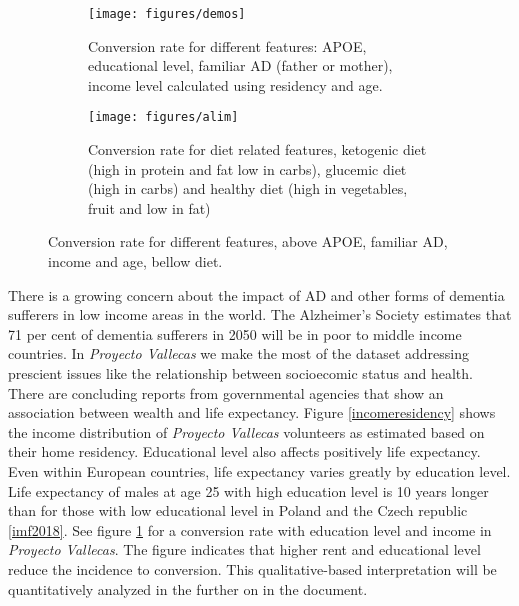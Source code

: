 \documentclass[11pt]{article}
\begin{document}
\begin{figure}[H]
    \centering
    \begin{subfigure}[t]{\textwidth}
        \centering
        \texttt{[image: figures/demos]}
        \caption{Conversion rate for different features: APOE, educational level, familiar AD (father or mother), income level calculated using residency and age.}

    \end{subfigure}
    
    \begin{subfigure}[t]{\textwidth}
        \centering
        \texttt{[image: figures/alim]}
        \caption{Conversion rate for diet related features, ketogenic diet (high in protein and fat low in carbs), glucemic diet (high in carbs) and healthy diet (high in vegetables, fruit and low in fat)}
    \end{subfigure}%
    
    \label{fig:demosalime}
    \caption{Conversion rate for different features, above APOE, familiar AD, income and age, bellow diet.}
\end{figure}

There is a growing concern about the impact of AD and other forms of dementia sufferers in low income areas in the world.
The Alzheimer’s Society estimates that 71 per cent of dementia sufferers in 2050 will be in poor to middle income countries.
In \emph{Proyecto Vallecas} we make the most of the dataset addressing prescient issues like the relationship between socioecomic status and health. There are concluding reports from governmental agencies that show an association between wealth and life expectancy. 
Figure \ref{incomeresidency} shows the income distribution of \emph{Proyecto Vallecas} volunteers as estimated based on their home residency. 
Educational level also affects positively life expectancy. Even within European countries, life expectancy varies greatly by education level. Life expectancy of males at age 25 with high education level is 10 years longer than for those with low educational level in Poland and the Czech republic \ref{imf2018}. 
See figure \ref{fig:demosalime} for a conversion rate with education level and income in \emph{Proyecto Vallecas}. The figure indicates that higher rent and educational level reduce the incidence to conversion. This qualitative-based interpretation will be quantitatively analyzed in the further on in the document.
\end{document}
